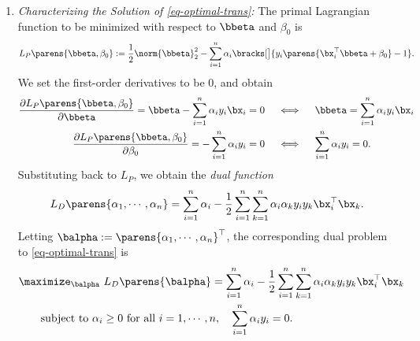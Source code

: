 \documentclass[12pt]{article}
\begin{document}
\begin{enumerate}[label=\textbf{\arabic*.}]
\begin{enumerate}
		\item \textit{Characterizing the Solution of \eqref{eq-optimal-trans}:} The primal Lagrangian function to be minimized with respect to $\bbeta$ and $\beta_0$ is 
		\begin{align}\label{eq-svm-primal}
			L_P \parens{\bbeta, \beta_0} := \frac{1}{2} \norm{\bbeta}_2^2 - \sum_{i=1}^n \alpha_i \bracks[\big]{ y_i \parens{\bx_i^\top \bbeta + \beta_0} - 1 }. 
		\end{align}
		We set the first-order derivatives to be 0, and obtain 
		\begin{align*}
			\frac{\partial L_P \parens{\bbeta, \beta_0}}{\partial \bbeta} = \bbeta - \sum_{i=1}^n \alpha_i  y_i \bx_i = 0 \hspace{10pt} & \iff \hspace{10pt} \bbeta = \sum_{i=1}^n \alpha_i y_i \bx_i \\ 
			\frac{\partial L_P \parens{\bbeta, \beta_0}}{\partial \beta_0} = - \sum_{i=1}^n \alpha_i y_i = 0 \hspace{10pt} & \iff \hspace{10pt} \sum_{i=1}^n \alpha_i y_i = 0. 
		\end{align*}
		Substituting back to $L_P$, we obtain the \textit{dual function} 
		\begin{equation*}
			L_D \parens{\alpha_1, \cdots, \alpha_n} = \sum_{i=1}^n \alpha_i - \frac{1}{2} \sum_{i=1}^n \sum_{k=1}^n \alpha_i \alpha_k y_i y_k \bx_i^\top \bx_k. 
		\end{equation*}
		Letting $\balpha := \parens{\alpha_1, \cdots, \alpha_n}^\top$, the corresponding dual problem to \eqref{eq-optimal-trans} is 
		\begin{equation}\label{eq-svm-dual-prob}
			\begin{aligned}
				& \maximize_{\balpha} \ L_D \parens{\balpha} = \sum_{i=1}^n \alpha_i - \frac{1}{2} \sum_{i=1}^n \sum_{k=1}^n \alpha_i \alpha_k y_i y_k \bx_i^\top \bx_k \\ 
				& \qquad \text{subject to } \alpha_i \ge 0 \text{ for all } i = 1, \cdots, n, \hspace{10pt} \sum_{i=1}^n \alpha_i y_i = 0. 
			\end{aligned}
		\end{equation}
		

\end{enumerate}
\end{enumerate}
\end{document}
